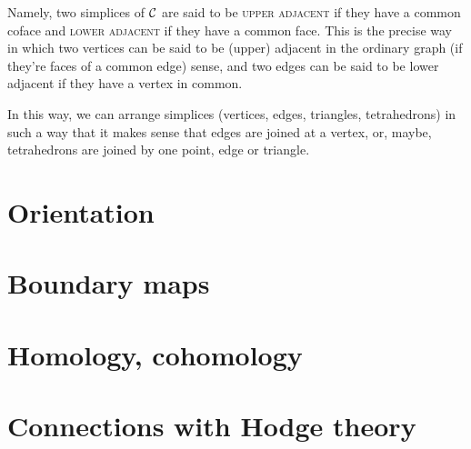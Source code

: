 \documentclass{tufte-handout}
\newcommand{\define}{\textsc}
\begin{document}
Namely, two simplices of $\sc$ are said to be \define{upper adjacent} if they have a common coface and \define{lower adjacent} if they have a common face. This is the precise way in which two vertices can be said to be (upper) adjacent in the ordinary graph (if they're faces of a common edge) sense, and two edges can be said to be lower adjacent if they have a vertex in common.

In this way, we can arrange simplices (vertices, edges, triangles, tetrahedrons) in such a way that it makes sense that edges are joined at a vertex, or, maybe, tetrahedrons are joined by one point, edge or triangle. 
\section{Orientation}
\section{Boundary maps}
\section{Homology, cohomology}

\section{Connections with Hodge theory}
\nocite{*}


\end{document}
